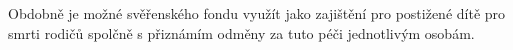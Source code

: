 \documentclass{article}
\begin{document}
 Obdobně je možné svěřenského fondu využít jako zajištění pro postižené dítě pro smrti rodičů spolčně s přiznámím odměny za tuto péči jednotlivým osobám.
 
 
 
 



\end{document}
